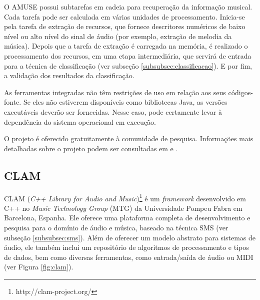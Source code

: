 O AMUSE possui subtarefas em cadeia para recuperação da informação musical. Cada tarefa pode ser calculada em várias unidades de processamento. Inicia-se pela tarefa de extração de recursos, que fornece descritores numéricos de baixo nível ou alto nível do sinal de áudio (por exemplo, extração de melodia da música). Depois que a tarefa de extração é carregada na memória, é realizado o processamento dos recursos, em uma etapa intermediária, que servirá de entrada para a técnica de classificação (ver subseção \ref{subsubsec:classificacao}). E por fim, a validação dos resultados da classificação. 

As ferramentas integradas não têm restrições de uso em relação aos seus códigos-fonte. Se eles não estiverem disponíveis como bibliotecas Java, as versões executáveis deverão ser fornecidas. Nesse caso, pode certamente levar à dependência do sistema operacional em execução.

O projeto é oferecido gratuitamente à comunidade de pesquisa. Informações mais detalhadas sobre o projeto podem ser consultadas em \cite{vatolkin2010} e \cite{amuse}.


\subsection{CLAM} \label{subsec:clam}
CLAM (\textit{C++ Library for Audio and Music})\footnote{http://clam-project.org/} é um \textit{framework} desenvolvido em C++ no \textit{Music Technology Group} (MTG) da Universidade Pompeu Fabra em Barcelona, Espanha. Ele oferece uma plataforma completa de desenvolvimento e pesquisa para o domínio de áudio e música, baseado na técnica SMS (ver subseção \ref{subsubsec:sms}). Além de oferecer um modelo abstrato para sistemas de áudio, ele também inclui um repositório de algoritmos de processamento e tipos de dados, bem como diversas ferramentas, como entrada/saída de áudio ou MIDI (ver Figura \ref{fig:clam}).

